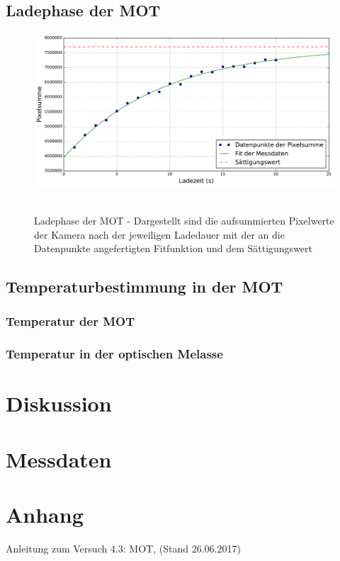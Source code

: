 \documentclass[twoside,colorback,accentcolor=tud4c,11pt]{tudreport}
\begin{document}
\section{Ladephase der MOT}
\begin{figure}[H]
\centering
   	\begin{minipage}[b]{0.85\textwidth}
   	\includegraphics[width=\textwidth]{graphics/laden.pdf}\
   	\end{minipage}
\caption{Ladephase der MOT - Dargestellt sind die aufsummierten Pixelwerte der Kamera nach der jeweiligen Ladedauer mit der an die Datenpunkte angefertigten Fitfunktion und dem Sättigungswert}\label{laden}	
\end{figure}
\section{Temperaturbestimmung in der MOT}
\subsection{Temperatur der MOT}
\subsection{Temperatur in der optischen Melasse}
\chapter{Diskussion}
\chapter{Messdaten}


\chapter{Anhang}





		

\renewcommand{\bibname}{Literaturverzeichnis}
\begin{thebibliography}{Bak89}
 Anleitung zum Versuch 4.3: MOT, (Stand 26.06.2017)


\end{thebibliography} 	
\end{document}
